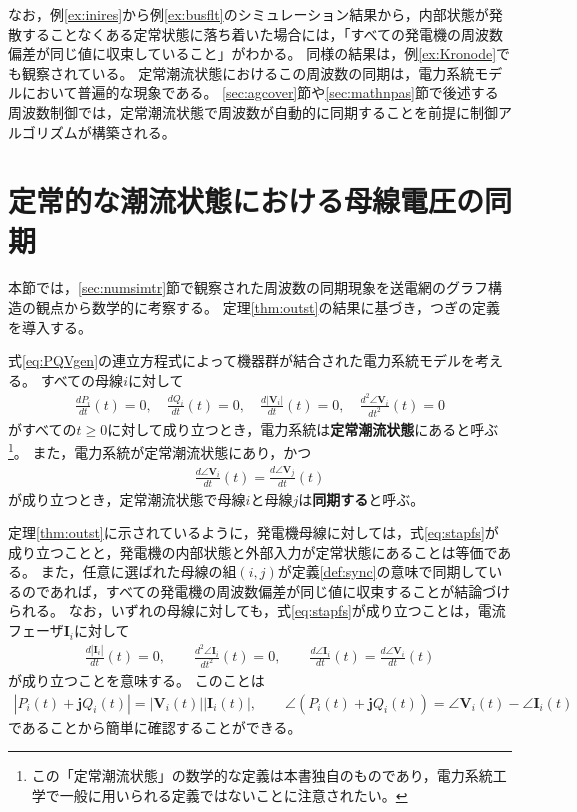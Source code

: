\documentclass[tombow,dvipdfmx]{corona-a5-1.1}
\begin{document}
なお，例\ref{ex:inires}から例\ref{ex:busflt}のシミュレーション結果から，内部状態が発散することなくある定常状態に落ち着いた場合には，「すべての発電機の周波数偏差が同じ値に収束していること」がわかる。
同様の結果は，例\ref{ex:Kronode}でも観察されている。
定常潮流状態におけるこの周波数の同期は，電力系統モデルにおいて普遍的な現象である。
\ref{sec:agcover}節や\ref{sec:mathnpas}節で後述する周波数制御では，定常潮流状態で周波数が自動的に同期することを前提に制御アルゴリズムが構築される。

\section{定常的な潮流状態における母線電圧の同期\advanced}\label{sec:phsync}

本節では，\ref{sec:numsimtr}節で観察された周波数の同期現象を送電網のグラフ構造の観点から数学的に考察する。
定理\ref{thm:outst}の結果に基づき，つぎの定義を導入する。

\begin{定義}[定常潮流状態と母線電圧の同期]
\label{def:sync}
式\ref{eq:PQVgen}の連立方程式によって機器群が結合された電力系統モデルを考える。
すべての母線$i$に対して
\begin{align}\label{eq:stapfs}
\frac{dP_i}{dt}(t)=0
,\quad
\frac{dQ_i}{dt}(t)=0
,\quad
\frac{d|\bm{V}_i|}{dt}(t)=0
,\quad
\frac{d^2 \angle \bm{V}_i }{dt^2}(t)=0
\end{align}
がすべての$t\geq0$に対して成り立つとき，電力系統は\textbf{定常潮流状態}にあると呼ぶ
\footnote{
この「定常潮流状態」の数学的な定義は本書独自のものであり，電力系統工学で一般に用いられる定義ではないことに注意されたい。
}。
また，電力系統が定常潮流状態にあり，かつ
\begin{align}\label{eq:defsyn}
\frac{d \angle \bm{V}_i}{dt}(t) =  \frac{d \angle \bm{V}_j}{dt}(t)
\end{align}
が成り立つとき，定常潮流状態で母線$i$と母線$j$は\textbf{同期する}と呼ぶ。
\end{定義}

定理\ref{thm:outst}に示されているように，発電機母線に対しては，式\ref{eq:stapfs}が成り立つことと，発電機の内部状態と外部入力が定常状態にあることは等価である。
また，任意に選ばれた母線の組$(i,j)$が定義\ref{def:sync}の意味で同期しているのであれば，すべての発電機の周波数偏差が同じ値に収束することが結論づけられる。
なお，いずれの母線に対しても，式\ref{eq:stapfs}が成り立つことは，電流フェーザ$\bm{I}_i$に対して
\begin{align*}
\frac{d|\bm{I}_i|}{dt}(t)=0
,\qquad
\frac{d^2 \angle \bm{I}_i }{dt^2}(t)=0
,\qquad
\frac{d \angle \bm{I}_i }{dt}(t) = \frac{d \angle \bm{V}_i }{dt} (t)
\end{align*}
が成り立つことを意味する。
このことは
\begin{align*}
|P_i(t) + \bm{j} Q_i(t)| = |\bm{V}_i(t)| |\bm{I}_i(t)|
,\qquad
\angle(P_i(t) + \bm{j} Q_i(t)) = \angle \bm{V}_i(t) - \angle \bm{I}_i(t)
\end{align*}
であることから簡単に確認することができる。
\end{document}
